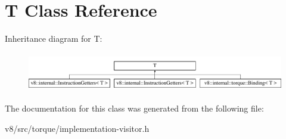 \hypertarget{classv8_1_1internal_1_1torque_1_1T}{}\section{T Class Reference}
\label{classv8_1_1internal_1_1torque_1_1T}
Inheritance diagram for T\+:\begin{figure}[H]
\begin{center}
\leavevmode
\includegraphics[height=1.720430cm]{classv8_1_1internal_1_1torque_1_1T}
\end{center}
\end{figure}


The documentation for this class was generated from the following file\+:\begin{DoxyCompactItemize}
\item 
v8/src/torque/implementation-\/visitor.\+h\end{DoxyCompactItemize}
